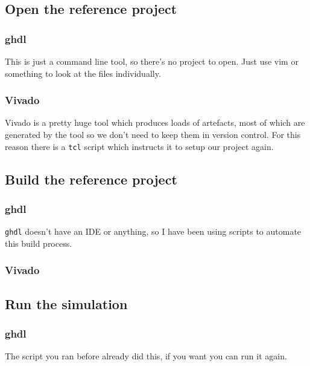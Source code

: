 \subsection{Open the reference project}
\subsubsection{ghdl}
This is just a command line tool, so there's no project to open. Just use vim or something to look at the files individually.

\subsubsection{Vivado}
Vivado is a pretty huge tool which produces loads of artefacts, most of which are generated by the tool so we don't need to keep them in version control. For this reason there is a \texttt{tcl} script which instructs it to setup our project again.


\subsection{Build the reference project}
\subsubsection{ghdl}
\texttt{ghdl} doesn't have an IDE or anything, so I have been using scripts to automate this build process. 


\subsubsection{Vivado}


\subsection{Run the simulation}
\subsubsection{ghdl} 
The script you ran before already did this, if you want you can run it again.

